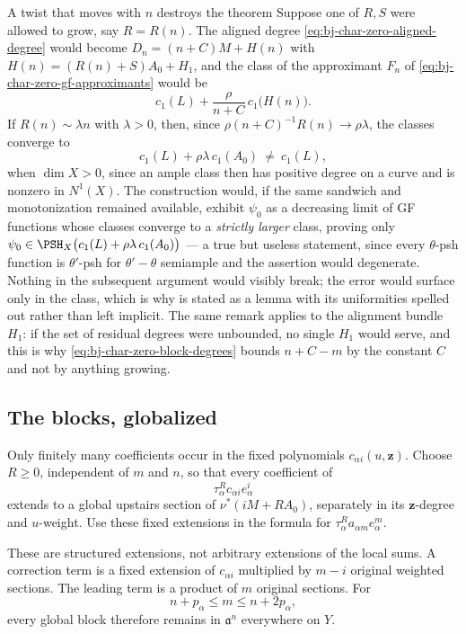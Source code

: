 \begin{warning}{A twist that moves with $n$ destroys the theorem}
\label{warn:ch44-moving-twist}
Suppose one of $R,S$ were allowed to grow, say $R=R(n)$.  The aligned
degree \eqref{eq:bj-char-zero-aligned-degree} would become
$D_n=(n+C)M+H(n)$ with $H(n)=(R(n)+S)A_0+H_1$, and the class of the
approximant $F_n$ of \eqref{eq:bj-char-zero-gf-approximants} would be
\[
 c_1(L)+\frac{\rho}{n+C}\,c_1\bigl(H(n)\bigr).
\]
If $R(n)\sim\lambda n$ with $\lambda>0$, then, since
$\rho(n+C)^{-1}R(n)\to\rho\lambda$, the classes converge to
\[
 c_1(L)+\rho\lambda\,c_1(A_0)\ \ne\ c_1(L),
\]
when $\dim X>0$, since an ample class then has positive degree on
a curve and is nonzero in $N^1(X)$.  The construction
would, if the same sandwich and monotonization remained available,
exhibit $\psi_0$ as a decreasing limit of GF functions whose
classes converge to a \emph{strictly larger} class, proving only
$\psi_0\in\PSH_X\bigl(c_1(L)+\rho\lambda\,c_1(A_0)\bigr)$ --- a true but
useless statement, since every $\theta$-psh function is
$\theta'$-psh for $\theta'-\theta$ semiample and the assertion would
degenerate.  Nothing in the subsequent argument would visibly break; the
error would surface only in the class, which is why
 is stated as a lemma with its uniformities
spelled out rather than left implicit.  The same remark applies to the
alignment bundle $H_1$: if the set of residual degrees were unbounded, no
single $H_1$ would serve, and this is why
\eqref{eq:bj-char-zero-block-degrees} bounds $n+C-m$ by the constant
$C$ and not by anything growing.
\end{warning}

\subsection{The blocks, globalized}
\label{sec:ch44-blocks}

Only finitely many coefficients occur in the fixed polynomials
$c_{\alpha i}(u,\mathbf z)$.
Choose $R\ge0$, independent of $m$ and $n$, so that every coefficient
of
\[
                         \tau_\alpha^R c_{\alpha i}e_\alpha^i
\tag{44.16}\label{eq:bj-char-zero-first-cutoff}
\]
extends to a global upstairs section of
$\nu^*(iM+RA_0)$, separately in its $\mathbf z$-degree and $u$-weight.
Use these fixed extensions in the formula for
$\tau_\alpha^Ra_{\alpha m}e_\alpha^m$.

These are structured extensions, not arbitrary extensions of the local sums.
A correction term is a fixed extension of $c_{\alpha i}$ multiplied by
$m-i$ original weighted sections.
The leading term is a product of $m$ original sections.
For
\[
                 n+p_\alpha\le m\le n+2p_\alpha,
\]
every global block therefore remains in $\mathfrak a^n$ everywhere on
$Y$.

